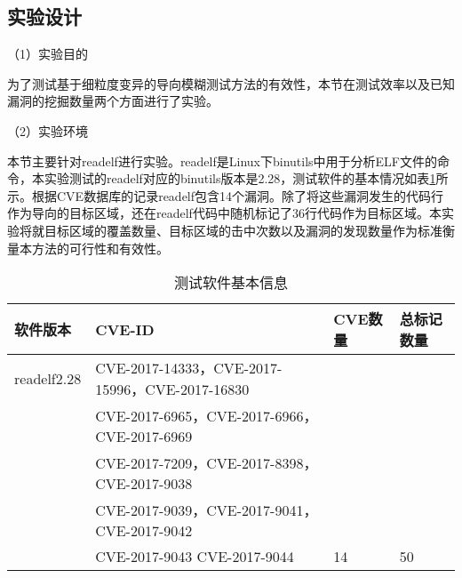 \subsection{实验设计}

（1）实验目的

为了测试基于细粒度变异的导向模糊测试方法的有效性，本节在测试效率以及已知漏洞的挖掘数量两个方面进行了实验。

（2）实验环境


本节主要针对readelf进行实验。readelf是Linux下binutils中用于分析ELF文件的命令，本实验测试的readelf对应的binutils版本是2.28，测试软件的基本情况如表\ref{测试软件基本信息}所示。根据CVE数据库的记录readelf包含14个漏洞。除了将这些漏洞发生的代码行作为导向的目标区域，还在readelf代码中随机标记了36行代码作为目标区域。本实验将就目标区域的覆盖数量、目标区域的击中次数以及漏洞的发现数量作为标准衡量本方法的可行性和有效性。

\begin{table}[ht]
\begin{center}
\caption{测试软件基本信息}
\label{测试软件基本信息}
\begin{small}
\begin{tabular}{|l|l|l|l|}
\hline
{\bf 软件版本} & {\bf CVE-ID} & {\bf CVE数量} & {\bf 总标记数量} \\
\hline
readelf2.28 & CVE-2017-14333，CVE-2017-15996，CVE-2017-16830 & &\\
& CVE-2017-6965，CVE-2017-6966，CVE-2017-6969 & & \\
& CVE-2017-7209，CVE-2017-8398，CVE-2017-9038 & & \\
& CVE-2017-9039，CVE-2017-9041，CVE-2017-9042 & & \\
& CVE-2017-9043 CVE-2017-9044 & 14 & 50\\
\hline
\end{tabular}
\end{small}
\end{center}
\end{table}

